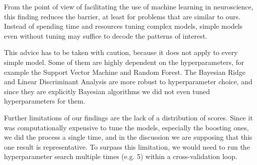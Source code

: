 From the point of view of facilitating the use of machine learning in neuroscience, this finding reduces the barrier, at least for problems that are similar to ours. Instead of spending time and resources tuning complex models, simple models even without tuning may suffice to decode the patterns of interest. 

This advice has to be taken with caution, because it does not apply to every simple model. Some of them are highly dependent on the hyperparameters, for example the Support Vector Machine and Random Forest. The Bayesian Ridge and Linear Discriminant Analysis are more robust to hyperparameter choice, and since they are explicitly Bayesian algorithms we did not even tuned hyperparameters for them. 

Further limitations of our findings are the lack of a distribution of scores. Since it was computationally expensive to tune the models, especially the boosting ones, we did the process a single time, and in the discussion we are supposing that this one result is representative. To surpass this limitation, we would need to run the hyperparameter search multiple times (e.g. 5) within a cross-validation loop.


